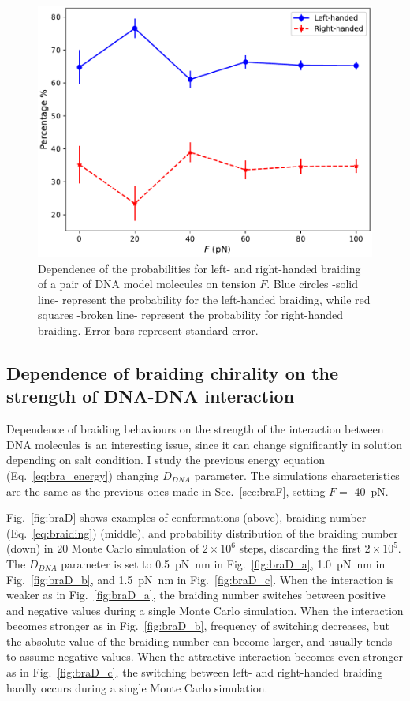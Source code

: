 \documentclass[a4paper,10pt]{article}
\begin{document}
\begin{figure}[tb]
\centering
\includegraphics[width=.5\textwidth]{brF_br_gr.pdf}
\caption{Dependence of the probabilities for left- and right-handed braiding of a pair of DNA model molecules on tension $F$.
Blue circles -solid line- represent the probability for the left-handed braiding, while red squares -broken line- represent the probability for right-handed braiding.
Error bars represent standard error.}
\label{fig:braF_pr}
\end{figure}

\subsection{Dependence of braiding chirality on the strength of DNA-DNA interaction}
Dependence of braiding behaviours on the strength of the interaction between DNA molecules is an interesting issue, since it can change significantly in solution depending on salt condition.
I study the previous energy equation (Eq.~\ref{eq:bra_energy}) changing $D_{DNA}$ parameter.
The simulations characteristics are the same as the previous ones made in Sec.~\ref{sec:braF}, setting $F=$ \SI{40}{\pico\newton}.

Fig.~\ref{fig:braD} shows examples of conformations (above), braiding number (Eq.~\ref{eq:braiding}) (middle), and probability distribution of the braiding number (down) in $20$ Monte Carlo simulation of $2\times 10^6$ steps, discarding the first $2\times 10^5$.
The $D_{DNA}$ parameter is set to \SI{0.5}{\pico\newton\nano\meter} in Fig.~\ref{fig:braD_a}, \SI{1.0}{\pico\newton\nano\meter} in Fig.~\ref{fig:braD_b}, and \SI{1.5}{\pico\newton\nano\meter} in Fig.~\ref{fig:braD_c}.
When the interaction is weaker as in Fig.~\ref{fig:braD_a}, the braiding number switches between positive and negative values during a single Monte Carlo simulation.
When the interaction becomes stronger as in Fig.~\ref{fig:braD_b}, frequency of switching decreases, but the absolute value of the braiding number can become larger, and usually tends to assume negative values.
When the attractive interaction becomes even stronger as in Fig.~\ref{fig:braD_c}, the switching between left- and right-handed braiding hardly occurs during a single Monte Carlo simulation.
\end{document}
